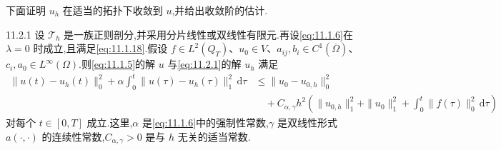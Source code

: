 下面证明 \(u_h\) 在适当的拓扑下收敛到 \(u\),并给出收敛阶的估计.

\begin{proposition}[]{11.2.1}
设 \(\mathcal T_h\) 是一族正则剖分,并采用分片线性或双线性有限元.再设\eqref{eq:11.1.6}在 \(\lambda=0\) 时成立,且满足\eqref{eq:11.1.18}.假设 \(f\in L^2(Q_T)\)、\(u_0\in V\)、\(a_{ij},b_i\in C^1(\overline\Omega)\)、\(c_i,a_0\in L^\infty(\Omega)\).则\eqref{eq:11.1.5}的解 \(u\) 与\eqref{eq:11.2.1}的解 \(u_h\) 满足
\begin{equation}\label{eq:11.2.3}
  \begin{aligned}
    \|u(t)-u_h(t)\|_0^2+\alpha\int_0^t\|u(\tau)-u_h(\tau)\|_1^2\,\mathrm d\tau
       &\le\|u_0-u_{0,h}\|_0^2\\
       &\quad+C_{\alpha,\gamma}h^2
         \left(\|u_{0,h}\|_1^2+\|u_0\|_1^2+\int_0^t\|f(\tau)\|_0^2\,\mathrm d\tau\right)
  \end{aligned}
\end{equation}
对每个 \(t\in[0,T]\) 成立.这里,\(\alpha\) 是\eqref{eq:11.1.6}中的强制性常数,\(\gamma\) 是双线性形式 \(a(\cdot,\cdot)\) 的连续性常数,\(C_{\alpha,\gamma}>0\) 是与 \(h\) 无关的适当常数.
\end{proposition}

